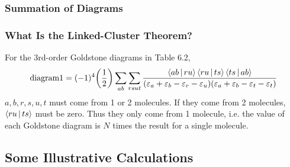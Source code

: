 \documentclass[a4paper]{article}
\begin{document}
\subsubsection{Summation of Diagrams}

\subsubsection{What Is the Linked-Cluster Theorem?}
For the 3rd-order Goldstone diagrams in Table 6.2,
\begin{equation}\label{key}
\text{diagram1} = (-1)^4 \qty(\dfrac{1}{2}) \sum_{ab}\sum_{rsut} \dfrac{\Braket{ab|ru}\Braket{ru|ts}\Braket{ts|ab} }{(\varepsilon_a + \varepsilon_b - \varepsilon_r - \varepsilon_u)(\varepsilon_a + \varepsilon_b - \varepsilon_t - \varepsilon_t)}
\end{equation}
$ a,b,r,s,u,t $ must come from 1 or 2 molecules. If they come from 2 molecules, $ \Braket{ru|ts} $ must be zero. Thus they only come from 1 molecule, i.e. the value of each Goldstone diagram is $ N $ times the result for a single molecule.





\subsection{Some Illustrative Calculations}
\end{document}
